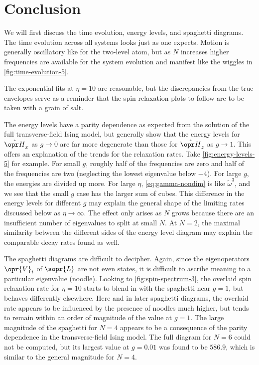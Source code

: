 \chapter*{Conclusion}

We will first discuss the time evolution, energy levels, and spaghetti diagrams.
The time evolution across all systems looks just as one expects. Motion is
generally oscillatory like for the two-level atom, but as $N$ increases higher
frequencies are available for the system evolution and manifest like the wiggles
in \cref{fig:time-evolution-5}.

The exponential fits at $\eta = 10$ are reasonable, but the discrepancies from
the true envelopes serve as a reminder that the spin relaxation plots to follow
are to be taken with a grain of salt.

The energy levels have a parity dependence as expected from the solution of the
full transverse-field Ising model, but generally show that the energy levels for
$\hat{\ham}_x$ as $g \to 0$ are far more degenerate than those for
$\hat{\ham}_z$ as $g \to 1$. This offers an explanation of the trends for the
relaxation rates. Take \cref{fig:energy-levels-5} for example. For small $g$,
roughly half of the frequencies are zero and half of the frequencies are two
(neglecting the lowest eigenvalue below $-4$). For large $g$, the energies are
divided up more. For large $\eta$, \cref{eq:gamma-nondim} is like
$\tilde{\omega}^3$, and we see that the small $g$ case has the larger sum of
cubes. This difference in the energy levels for different $g$ may explain the
general shape of the limiting rates discussed below as $\eta \to \infty$. The
effect only arises as $N$ grows because there are an insufficient number of
eigenvalues to split at small $N$. At $N = 2$, the maximal similarity between
the different sides of the energy level diagram may explain the comparable decay
rates found as well.

The spaghetti diagrams are difficult to decipher. Again, since the
eigenoperators $\opr{V}_i$ of $\sopr{L}$ are not even states, it is difficult to
ascribe meaning to a particular eigenvalue (noodle). Looking to
\cref{fig:spin-spectrum-3}, the overlaid spin relaxation rate for $\eta = 10$
starts to blend in with the spaghetti near $g = 1$, but behaves differently
elsewhere. Here and in later spaghetti diagrams, the overlaid rate appears to be
influenced by the presence of noodles much higher, but tends to remain within an
order of magnitude of the value at $g = 1$. The large magnitude of the spaghetti
for $N = 4$ appears to be a consequence of the parity dependence in the
transverse-field Ising model. The full diagram for $N = 6$ could not be
computed, but its largest value at $g = 0.01$ was found to be $586.9$, which is
similar to the general magnitude for $N = 4$.

